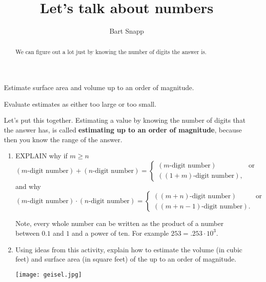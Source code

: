 \documentclass[nooutcomes,noauthor,hints]{ximera}
\title{Let's talk about numbers}
\author{Bart Snapp}
\begin{document}
\begin{abstract}
  We can figure out a lot just by knowing the number of digits the
  answer is.
\end{abstract}
\maketitle


\begin{listOutcomes}
\item Estimate surface area and volume up to an order of magnitude.
\item Evaluate estimates as either too large or too small.
\end{listOutcomes}

\begin{question}
  Let's put this together. Estimating a value by knowing the number
  of digits that the answer has, is called \textbf{estimating up to an
    order of magnitude}, because then you know the range of the
  answer.
  \begin{enumerate}
  \item EXPLAIN why if $m\ge n$
    \[
    (\text{$m$-digit number}) + (\text{$n$-digit number}) =
    \begin{cases}
      (\text{$m$-digit number}) & \text{or}\\
      (\text{$(1+m)$-digit number}),
    \end{cases}
    \]
    and why
    \[
    (\text{$m$-digit number}) \cdot (\text{$n$-digit number}) = \begin{cases}
      (\text{$(m+n)$-digit number}) & \text{or}\\
      (\text{$(m+n-1)$-digit number}).
    \end{cases}
    \]
    \begin{hint}
    Note, every whole number can be written as the product of a number
    between $0.1$ and $1$ and a power of ten. For example $253 =
    .253\cdot 10^3$.
  \end{hint}
  \item Using ideas from this activity, explain how to estimate the
    volume (in cubic feet) and surface area (in square feet) of the  up to an
    order of magnitude.

  \begin{center}
    \texttt{[image: geisel.jpg]} 
  \end{center}


\end{enumerate}
\end{question}
\end{document}
